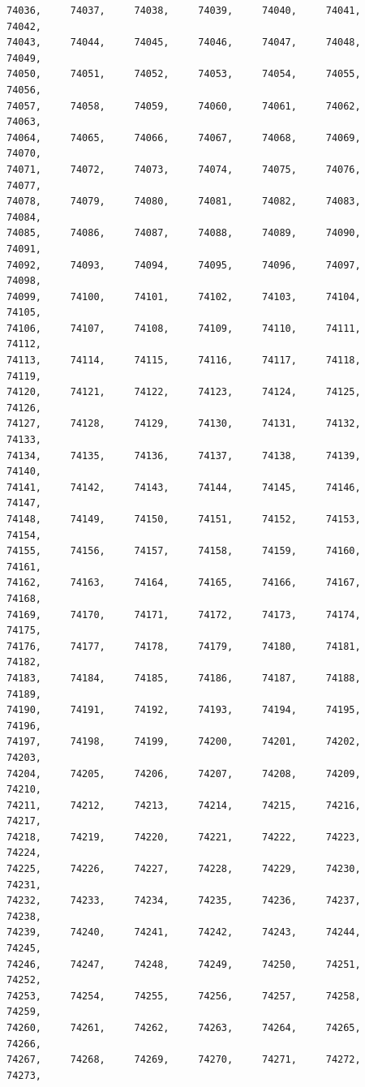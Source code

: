 \documentclass[a4paper,11pt]{report}
\begin{document}
\begin{verbatim}
74036,     74037,     74038,     74039,     74040,     74041,     74042,     
74043,     74044,     74045,     74046,     74047,     74048,     74049,     
74050,     74051,     74052,     74053,     74054,     74055,     74056,     
74057,     74058,     74059,     74060,     74061,     74062,     74063,     
74064,     74065,     74066,     74067,     74068,     74069,     74070,     
74071,     74072,     74073,     74074,     74075,     74076,     74077,     
74078,     74079,     74080,     74081,     74082,     74083,     74084,     
74085,     74086,     74087,     74088,     74089,     74090,     74091,     
74092,     74093,     74094,     74095,     74096,     74097,     74098,     
74099,     74100,     74101,     74102,     74103,     74104,     74105,     
74106,     74107,     74108,     74109,     74110,     74111,     74112,     
74113,     74114,     74115,     74116,     74117,     74118,     74119,     
74120,     74121,     74122,     74123,     74124,     74125,     74126,     
74127,     74128,     74129,     74130,     74131,     74132,     74133,     
74134,     74135,     74136,     74137,     74138,     74139,     74140,     
74141,     74142,     74143,     74144,     74145,     74146,     74147,     
74148,     74149,     74150,     74151,     74152,     74153,     74154,     
74155,     74156,     74157,     74158,     74159,     74160,     74161,     
74162,     74163,     74164,     74165,     74166,     74167,     74168,     
74169,     74170,     74171,     74172,     74173,     74174,     74175,     
74176,     74177,     74178,     74179,     74180,     74181,     74182,     
74183,     74184,     74185,     74186,     74187,     74188,     74189,     
74190,     74191,     74192,     74193,     74194,     74195,     74196,     
74197,     74198,     74199,     74200,     74201,     74202,     74203,     
74204,     74205,     74206,     74207,     74208,     74209,     74210,     
74211,     74212,     74213,     74214,     74215,     74216,     74217,     
74218,     74219,     74220,     74221,     74222,     74223,     74224,     
74225,     74226,     74227,     74228,     74229,     74230,     74231,     
74232,     74233,     74234,     74235,     74236,     74237,     74238,     
74239,     74240,     74241,     74242,     74243,     74244,     74245,     
74246,     74247,     74248,     74249,     74250,     74251,     74252,     
74253,     74254,     74255,     74256,     74257,     74258,     74259,     
74260,     74261,     74262,     74263,     74264,     74265,     74266,     
74267,     74268,     74269,     74270,     74271,     74272,     74273,     

\end{verbatim}
\end{document}
